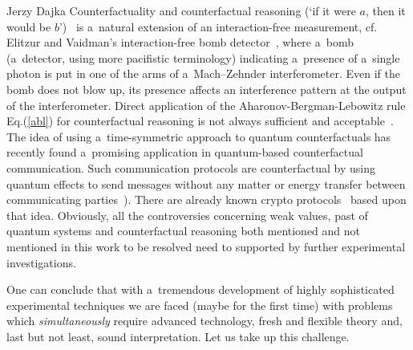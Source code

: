 \begin{artengenv}{Jerzy Dajka}
Counterfactuality and counterfactual reasoning (`if it were $a$, then it would be $b$')~\parencite{kont_book,kont0}  is a~natural  extension of an interaction-free measurement, cf. Elitzur
and Vaidman’s interaction-free bomb detector~\parencite{bomb}, where a~bomb (a~detector, using more pacifistic terminology) indicating a~presence of a~single photon is put in
one of the arms of a~Mach–Zehnder interferometer. Even if the
bomb does not blow up, its  presence  affects an interference pattern  at the output of the interferometer.  Direct application of the Aharonov-Bergman-Lebowitz rule Eq.(\ref{abl}) for counterfactual reasoning is not always sufficient and acceptable~\parencite{kont0}. The idea of using a~time-symmetric approach to quantum counterfactuals has  recently  found a~promising application in quantum-based counterfactual communication. Such communication protocols are counterfactual by using quantum effects to send
messages without any matter or energy transfer between communicating
parties~\parencite{kont1,kont2}). There are already known crypto protocols~\parencite{kont_crypto, kont_crypto0,kont_crypto1,kont_crypto1,kont_crypto2} based upon that idea.
Obviously, all the controversies concerning weak values, past of quantum systems and counterfactual reasoning both mentioned and not mentioned in this work to be resolved need to supported by further experimental investigations. 

One can conclude that with a~tremendous development of highly sophisticated  experimental techniques we are faced (maybe for the first time) with problems which {\it simultaneously} require advanced technology, fresh and flexible theory and, last but not least, sound interpretation. Let us take up this challenge.    
 

\end{artengenv}
